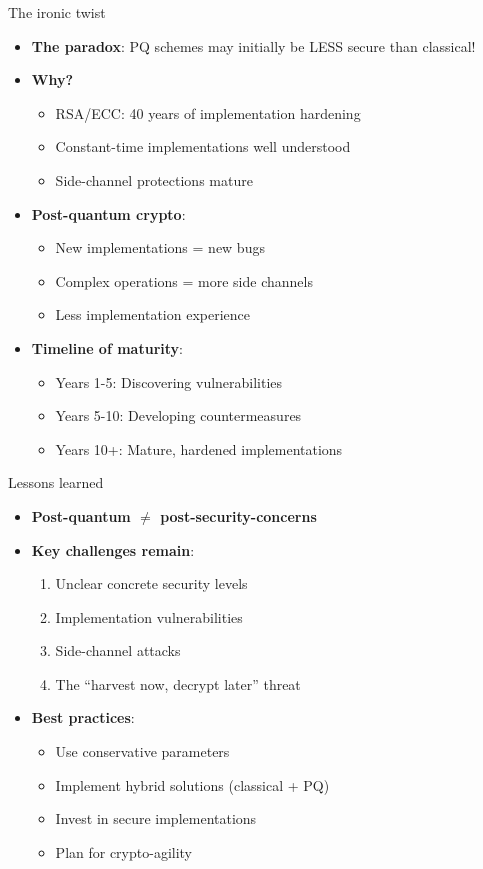 \documentclass[aspectratio=169, lualatex, handout]{beamer}
\begin{document}
\begin{frame}{The ironic twist}
	\begin{itemize}
		\item \textbf{The paradox}: PQ schemes may initially be LESS secure than classical!
		\item \textbf{Why?}
		      \begin{itemize}
			      \item RSA/ECC: 40 years of implementation hardening
			      \item Constant-time implementations well understood
			      \item Side-channel protections mature
		      \end{itemize}
		\item \textbf{Post-quantum crypto}:
		      \begin{itemize}
			      \item New implementations = new bugs
			      \item Complex operations = more side channels
			      \item Less implementation experience
		      \end{itemize}
		\item \textbf{Timeline of maturity}:
		      \begin{itemize}
			      \item Years 1-5: Discovering vulnerabilities
			      \item Years 5-10: Developing countermeasures
			      \item Years 10+: Mature, hardened implementations
		      \end{itemize}
	\end{itemize}
\end{frame}

\begin{frame}{Lessons learned}
	\begin{itemize}
		\item \textbf{Post-quantum $\neq$ post-security-concerns}
		\item \textbf{Key challenges remain}:
		      \begin{enumerate}
			      \item Unclear concrete security levels
			      \item Implementation vulnerabilities
			      \item Side-channel attacks
			      \item The ``harvest now, decrypt later'' threat
		      \end{enumerate}
		\item \textbf{Best practices}:
		      \begin{itemize}
			      \item Use conservative parameters
			      \item Implement hybrid solutions (classical + PQ)
			      \item Invest in secure implementations
			      \item Plan for crypto-agility
		      \end{itemize}
	\end{itemize}
\end{frame}

\begin{frame}[plain]
	\titlepage
\end{frame}
\end{document}
